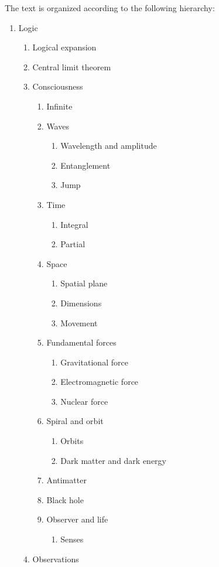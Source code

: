 \noindent The text is organized according to the following hierarchy:
	{\scriptsize
	\begin{enumerate}[label*=\arabic*.]
	   \item Logic
	   \begin{enumerate}[label*=\arabic*.]
		   \item Logical expansion
		   \item Central limit theorem
		   \item Consciousness
			   \begin{enumerate}[label*=\arabic*.]
				   \item Infinite
				   \item Waves 
				   \begin{enumerate}[label*=\arabic*.]
				   		\item Wavelength and amplitude
				   		\item Entanglement
				   		\item Jump
				   \end{enumerate}  
				   \item Time
				   \begin{enumerate}[label*=\arabic*.]
				   		\item Integral 
				   		\item Partial 
				   \end{enumerate} 
				   \item Space 
				   \begin{enumerate}[label*=\arabic*.]
				   		\item Spatial plane 
				   		\item Dimensions  
				   		\item Movement
				   \end{enumerate}
				   \item Fundamental forces
				   \begin{enumerate}[label*=\arabic*.]
				   		\item Gravitational force 
				   		\item Electromagnetic force
				   		\item Nuclear force
				   \end{enumerate} 
				   \item Spiral and orbit
				   \begin{enumerate}[label*=\arabic*.]
				   		\item Orbits
				   		\item Dark matter and dark energy
				   \end{enumerate} 
				   \item Antimatter
				   \item Black hole
				   \item Observer and life
				   \begin{enumerate}[label*=\arabic*.]
				   		\item Senses
				   \end{enumerate}  
			   \end{enumerate}
			   \item Observations
	   \end{enumerate}
	\end{enumerate}
	}

